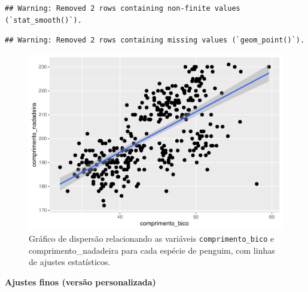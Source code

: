 \documentclass[
]{article}
\begin{document}
\begin{verbatim}
## Warning: Removed 2 rows containing non-finite values (`stat_smooth()`).
\end{verbatim}

\begin{verbatim}
## Warning: Removed 2 rows containing missing values (`geom_point()`).
\end{verbatim}

\begin{figure}
\centering
\includegraphics{epr_files/figure-latex/fig-scatter-smooth-1.pdf}
\caption{\label{fig:fig-scatter-smooth}Gráfico de dispersão relacionando as variáveis \texttt{comprimento\_bico} e comprimento\_nadadeira para cada espécie de penguim, com linhas de ajustes estatísticos.}
\end{figure}

\textbf{Ajustes finos (versão personalizada)}
\end{document}
